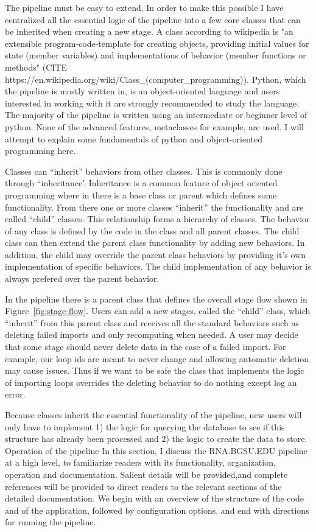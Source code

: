 The pipeline must be easy to extend. In order to make this possible I have
centralized all the essential logic of the pipeline into a few core classes that
can be inherited when creating a new stage. A class according to wikipedia is
"an extensible program-code-template for creating objects, providing initial
values for state (member variables) and implementations of behavior (member
functions or methods" (CITE
https://en.wikipedia.org/wiki/Class\_(computer\_programming)). Python, which the
pipeline is mostly written in, is an object-oriented language and users
interested in working with it are strongly recommended to study the language.
The majority of the pipeline is written using an intermediate or beginner level
of python. None of the advanced features, metaclasses for example, are used. I
will attempt to explain some fundamentals of python and object-oriented
programming here.

Classes can ``inherit'' behaviors from other classes. This is commonly done
through ``inheritance'. Inheritance is a common feature of object oriented
programming where in there is a base class or parent which defines some
functionality. From there one or more classes ``inherit'' the functionality and
are called ``child'' classes. This relationship forms a hierarchy of classes. The
behavior of any class is defined by the code in the class and all parent
classes. The child class can then extend the parent class functionality by
adding new behaviors. In addition, the child may override the parent class
behaviors by providing it's own implementation of specific behaviors. The child
implementation of any behavior is always prefered over the parent behavior.

In the pipeline there is a parent class that defines the overall stage flow
shown in Figure~\ref{fig:stage-flow}. Users can add a  new stages, called the
``child'' class, which ``inherit'' from this parent class and receives all the
standard behaviors such as deleting failed imports and only recomputing when
needed. A user may decide that some stage should never delete data in the case
of a failed import. For example, our loop ids are meant to never change and
allowing automatic deletion may cause issues. Thus if we want to be safe the
class that implements the logic of importing loops overrides the deleting
behavior to do nothing except log an error.

Because classes inherit the essential functionality of the pipeline, new users will only have to
implement 1) the logic for querying the database to see if this structure has already been
processed and 2) the logic to create the data to store.
Operation of the pipeline
In this section, I discuss the RNA.BGSU.EDU pipeline at a high level, to familiarize readers with
its functionality, organization, operation and documentation. Salient details will be provided,and
complete references will be provided to direct readers to the relevant sections of the detailed
documentation. We begin with an overview of the structure of the code and of the application,
followed by configuration options, and end with directions for running the pipeline.


